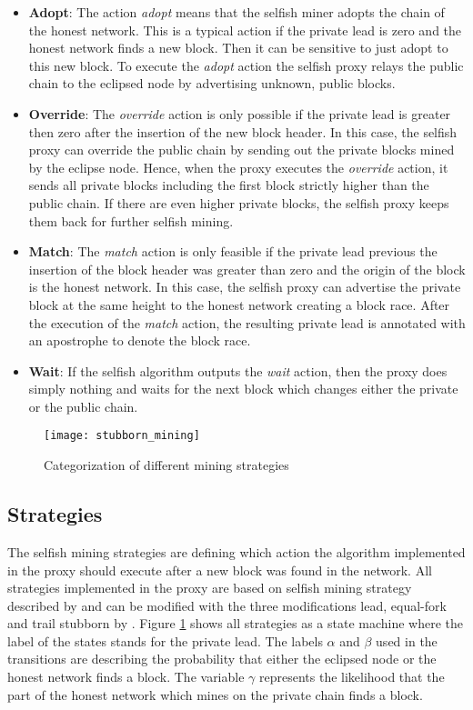 \begin{itemize}
	\item \textbf{Adopt}: 
	The action \textit{adopt} means that the selfish miner adopts the chain of the honest network. 
	This is a typical action if the private lead is zero and the honest network finds a new block. 
	Then it can be sensitive to just adopt to this new block.
	To execute the \textit{adopt} action the selfish proxy relays the public chain to the eclipsed node by advertising unknown, public blocks.
	\item \textbf{Override}:
	The \textit{override} action is only possible if the private lead is greater then zero after the insertion of the new block header.
	In this case, the selfish proxy can override the public chain by sending out the private blocks mined by the eclipse node.
	Hence, when the proxy executes the \textit{override} action, it sends all private blocks including the first block strictly higher than the public chain.
	If there are even higher private blocks, the selfish proxy keeps them back for further selfish mining.
	\item \textbf{Match}:
	The \textit{match} action is only feasible if the private lead previous the insertion of the block header was greater than zero and the origin of the block is the honest network.
	In this case, the selfish proxy can advertise the private block at the same height to the honest network creating a block race.
	After the execution of the \textit{match} action, the resulting private lead is annotated with an apostrophe to denote the block race.
	\item \textbf{Wait}:
	If the selfish algorithm outputs the \textit{wait} action, then the proxy does simply nothing and waits for the next block which changes either the private or the public chain.
\end{itemize}

\begin{figure}[t]
\texttt{[image: stubborn\_mining]}
\centering
\caption{Categorization of different mining strategies \cite{nayak2016stubborn}}
\label{fig:stubborn_mining}
\end{figure}

\subsection{Strategies}

The selfish mining strategies are defining which action the algorithm implemented in the proxy should execute after a new block was found in the network.
All strategies implemented in the proxy are based on selfish mining strategy described by \cite{eyal2014majority} and can be modified with the three modifications lead, equal-fork and trail stubborn by \cite{nayak2016stubborn}.
Figure \ref{fig:stubborn_mining} shows all strategies as a state machine where the label of the states stands for the private lead.
The labels $\alpha$ and $\beta$ used in the transitions are describing the probability that either the eclipsed node or the honest network finds a block.
The variable $\gamma$ represents the likelihood that the part of the honest network which mines on the private chain finds a block.

